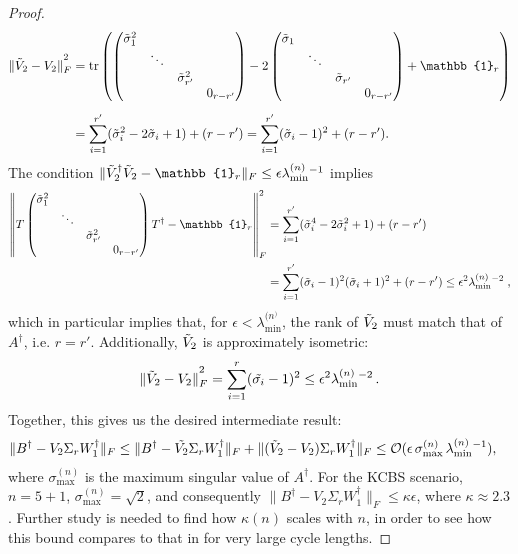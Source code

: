 \begin{proof}
\begin{align*}
\|\Tilde{V}_2-V_2\|_F^{\textstyle ^2} & =\operatorname{tr}\left(
\begin{pmatrix}
\Tilde{\sigma}_1^2&&&\\
&\ddots&&\\
&&\Tilde{\sigma}_{r'}^2&\\
&&& 0_{r-r'}
\end{pmatrix} -2
\begin{pmatrix}
\Tilde{\sigma}_1&&&\\
&\ddots&&\\
&&\Tilde{\sigma}_{r'}&\\
&&& 0_{r-r'}
\end{pmatrix}+\mathbb{1}_r\right)\\[0.5em] &  =\sum_{i=1}^{r'}(\Tilde{\sigma}_i^2-2\Tilde{\sigma}_i+1) + (r-r') =\sum_{i=1}^{r'}(\Tilde{\sigma}_i-1)^2+(r-r').
\end{align*}
The condition $\|\Tilde{V}_2^{\dag}\Tilde{V}_2 -\mathbb{1}_r\|_F\leq\epsilon\lambda_{\text{min}}^{(n)}{}^{-1}$ implies
\begin{align*}
\left\|T
\begin{pmatrix}
\Tilde{\sigma}_1^2&&& \\
&\ddots&& \\
&&\Tilde{\sigma}_{r'}^2& \\
&&&0_{r-r'}
\end{pmatrix}T^{\dag}-\mathbb{1}_r\right\|_F^2 & =\sum_{i=1}^{r'}(\Tilde{\sigma}_i^4-2\Tilde{\sigma}_i^2+1) + (r-r') \\
& = \sum_{i=1}^{r'}(\Tilde{\sigma}_i-1)^2(\Tilde{\sigma}_i+1)^2 + (r-r')\leq \epsilon^2\lambda_{\text{min}}^{(n)}{}^{-2}\;,
\end{align*}
which in particular implies that, for $\epsilon<\lambda_{\text{min}}^{(n^)}$, the rank of $\Tilde{V}_2$ must match that of $A^{\dag}$, i.e. $r=r'$. Additionally, $\Tilde{V}_2$ is approximately isometric:
\begin{equation*}
\|\Tilde{V}_2-V_2\|_F^{\textstyle ^2} = \sum_{i=1}^r(\Tilde{\sigma_i}-1)^2\leq\epsilon^2\lambda_{\text{min}}^{(n)}{}^{-2}\thinspace.
\end{equation*}
Together, this gives us the desired intermediate result:
\begin{align*}
\|B^{\dag}-V_2\Sigma_r W_1^{\dag}\|_F\leq \|B^{\dag}-\Tilde{V_2}\Sigma_r W_1^{\dag}\|_F + \|(\Tilde{V}_2-V_2)\Sigma_r W_1^{\dag}\|_F & \leq \mathcal{O}(\epsilon\thinspace\sigma_{\text{max}}^{(n)}\thinspace\lambda_{\text{min}}^{(n)}{}^{-1}),
\end{align*}
where $\sigma_{\text{max}}^{(n)}$ is the maximum singular value of $A^{\dag}$. For the KCBS scenario, $n=5+1$, $\sigma_{\text{max}}^{(n)}=\sqrt{2}$, and consequently $\|B^{\dag}-V_2\Sigma_r W_1^{\dag}\|_F\leq \kappa\epsilon$, where $\kappa \approx 2.3$. Further study is needed to find how $\kappa(n)$ scales with $n$, in order to see how this bound compares to that in \cite{Bharti2019} for very large cycle lengths.


\end{proof}
